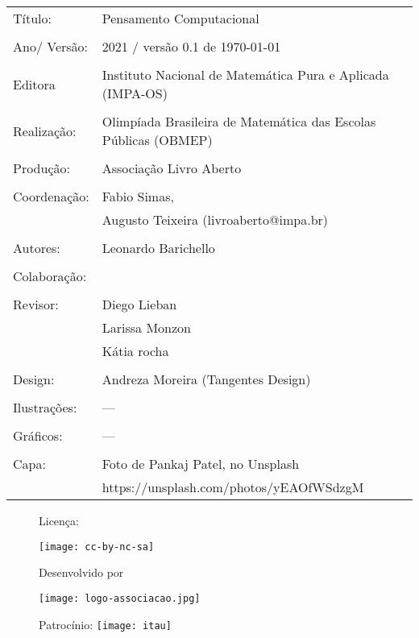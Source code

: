 \begin{tabular}{p{}p{}}
Título: & Pensamento Computacional\\
\\
Ano/ Versão: & 2021 / versão 0.1 de \today\\
\\
Editora & Instituto Nacional de Matem\'atica Pura e Aplicada (IMPA-OS)\\
\\
Realização:& Olimp\'iada Brasileira de Matem\'atica das Escolas P\'ublicas (OBMEP)\\
\\
Produção:& Associação Livro Aberto\\
\\
Coordenação: & Fabio Simas, \\
			&  Augusto Teixeira (livroaberto@impa.br)\\
\\
  Autores: & Leonardo Barichello\\
\\
Colaboração: & \\
\\
Revisor: & Diego Lieban \\ 
         & Larissa Monzon \\
         & Kátia rocha \\
\\
Design: & Andreza Moreira (Tangentes Design) \\
\\
  Ilustrações: & --- \\ 
\\
Gráficos: & ---\\
\\
  Capa: & Foto de Pankaj Patel, no Unsplash \\
  		& https://unsplash.com/photos/yEAOfWSdzgM \\

\end{tabular}
\vspace{.5cm}



\begin{figure}[b]
\begin{minipage}[l]{5cm}
\centering

{\large Licença:}

  \texttt{[image: cc-by-nc-sa]}
\end{minipage}\hfill
\begin{minipage}[c]{5cm}
\centering
{\large Desenvolvido por}

\texttt{[image: logo-associacao.jpg]}
\end{minipage}
\begin{minipage}[r]{5cm}
\centering

{\large Patrocínio:}
  \vspace{1em}
  \texttt{[image: itau]}
\end{minipage}
\end{figure}

